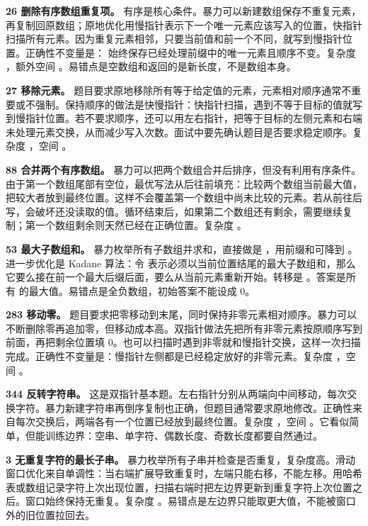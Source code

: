 \textbf{26 删除有序数组重复项。} 有序是核心条件。暴力可以新建数组保存不重复元素，再复制回原数组；原地优化用慢指针表示下一个唯一元素应该写入的位置，快指针扫描所有元素。因为重复元素相邻，只要当前值和前一个不同，就写到慢指针位置。正确性不变量是：\code{[0, slow)} 始终保存已经处理前缀中的唯一元素且顺序不变。复杂度 ，额外空间 。易错点是空数组和返回的是新长度，不是数组本身。

\textbf{27 移除元素。} 题目要求原地移除所有等于给定值的元素，元素相对顺序通常不重要或不强制。保持顺序的做法是快慢指针：快指针扫描，遇到不等于目标的值就写到慢指针位置。若不要求顺序，还可以用左右指针，把等于目标的左侧元素和右端未处理元素交换，从而减少写入次数。面试中要先确认题目是否要求稳定顺序。复杂度 ，空间 。

\textbf{88 合并两个有序数组。} 暴力可以把两个数组合并后排序，但没有利用有序条件。由于第一个数组尾部有空位，最优写法从后往前填充：比较两个数组当前最大值，把较大者放到最终位置。这样不会覆盖第一个数组中尚未比较的元素。若从前往后写，会破坏还没读取的值。循环结束后，如果第二个数组还有剩余，需要继续复制；第一个数组剩余则天然已经在正确位置。复杂度 。

\textbf{53 最大子数组和。} 暴力枚举所有子数组并求和，直接做是 ，用前缀和可降到 。进一步优化是 Kadane 算法：令  表示必须以当前位置结尾的最大子数组和，那么它要么接在前一个最大后缀后面，要么从当前元素重新开始。转移是 。答案是所有  的最大值。易错点是全负数组，初始答案不能设成 0。

\textbf{283 移动零。} 题目要求把零移动到末尾，同时保持非零元素相对顺序。暴力可以不断删除零再追加零，但移动成本高。双指针做法先把所有非零元素按原顺序写到前面，再把剩余位置填 0。也可以扫描时遇到非零就和慢指针交换，这样一次扫描完成。正确性不变量是：慢指针左侧都是已经稳定放好的非零元素。复杂度 ，空间 。

\textbf{344 反转字符串。} 这是双指针基本题。左右指针分别从两端向中间移动，每次交换字符。暴力新建字符串再倒序复制也正确，但题目通常要求原地修改。正确性来自每次交换后，两端各有一个位置已经放到最终位置。复杂度 ，空间 。它看似简单，但能训练边界：空串、单字符、偶数长度、奇数长度都要自然通过。

\textbf{3 无重复字符的最长子串。} 暴力枚举所有子串并检查是否重复，复杂度高。滑动窗口优化来自单调性：当右端扩展导致重复时，左端只能右移，不能左移。用哈希表或数组记录字符上次出现位置，扫描右端时把左边界更新到重复字符上次位置之后。窗口始终保持无重复。复杂度 。易错点是左边界只能取更大值，不能被窗口外的旧位置拉回去。

